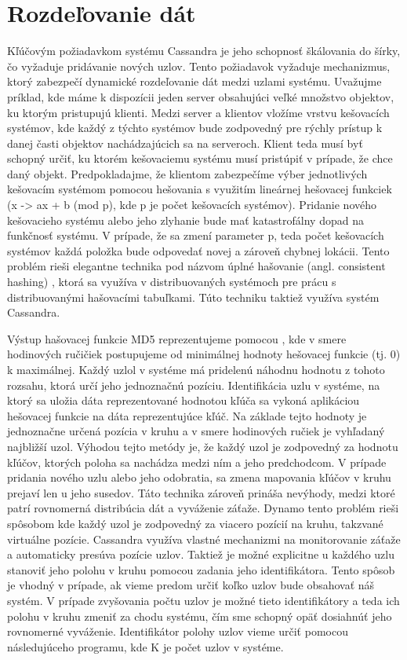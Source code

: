 \documentclass[11pt,twoside,a4paper]{book}
\begin{document}
\section{Rozdeľovanie dát}
Kľúčovým požiadavkom systému Cassandra je jeho schopnosť škálovania do šírky, čo vyžaduje pridávanie nových uzlov. Tento požiadavok vyžaduje mechanizmus, ktorý zabezpečí dynamické rozdeľovanie dát medzi uzlami systému. Uvažujme príklad, kde máme k dispozícii jeden server obsahujúci veľké množstvo objektov, ku ktorým pristupujú klienti. Medzi server a klientov vložíme vrstvu kešovacích systémov, kde každý z týchto systémov bude zodpovedný pre rýchly prístup k danej časti objektov nachádzajúcich sa na serveroch. Klient teda musí byť schopný určiť, ku ktorém kešovaciemu systému musí pristúpiť v prípade, že chce daný objekt. Predpokladajme, že klientom zabezpečíme výber jednotlivých kešovacím systémom pomocou hešovania s využitím lineárnej hešovacej funkciek (x -> ax + b (mod p), kde p je počet kešovacích systémov). Pridanie nového kešovacieho systému alebo jeho zlyhanie bude mať katastrofálny dopad na funkčnosť systému. V prípade, že sa zmení parameter p, teda počet kešovacích systémov každá položka bude odpovedať novej a zároveň chybnej lokácii. Tento problém rieši elegantne technika pod názvom úplné hašovanie (angl. consistent hashing) \cite{Karger:1997:CHR:258533.258660}, ktorá sa využíva v distribuovaných systémoch pre prácu s distribuovanými hašovacími tabuľkami. Túto techniku taktiež využíva systém Cassandra.

Výstup hašovacej funkcie MD5 reprezentujeme pomocou , kde v smere hodinových ručičiek postupujeme od minimálnej hodnoty hešovacej funkcie (tj. 0) k maximálnej. Každý uzlol v systéme má pridelenú náhodnu hodnotu z tohoto rozsahu, ktorá určí jeho jednoznačnú pozíciu. Identifikácia uzlu v systéme, na ktorý sa uložia dáta reprezentované hodnotou kľúča sa vykoná aplikáciou hešovacej funkcie na dáta reprezentujúce kľúč. Na základe tejto hodnoty je jednoznačne určená pozícia v kruhu a v smere hodinových ručiek je vyhľadaný najbližší uzol. Výhodou tejto metódy je, že každý uzol je zodpovedný za hodnotu kľúčov, ktorých poloha sa nachádza medzi ním a jeho predchodcom. V prípade pridania nového uzlu alebo jeho odobratia, sa zmena mapovania kľúčov v kruhu prejaví len u jeho susedov. Táto technika zároveň prináša nevýhody, medzi ktoré patrí rovnomerná distribúcia dát a vyváženie záťaže. Dynamo tento problém rieši spôsobom kde každý uzol je zodpovedný za viacero pozícií na kruhu, takzvané virtuálne pozície. Cassandra využíva vlastné mechanizmi na monitorovanie záťaže a automaticky presúva pozície uzlov. Taktiež je možné explicitne u každého uzlu stanoviť jeho polohu v kruhu pomocou zadania jeho identifikátora. Tento spôsob je vhodný v prípade, ak vieme predom určiť koľko uzlov bude obsahovať náš systém. V prípade zvyšovania počtu uzlov je možné tieto identifikátory a teda ich polohu v kruhu zmeniť za chodu systému, čím sme schopný opäť dosiahnúť jeho rovnomerné vyváženie. Identifikátor polohy uzlov vieme určiť pomocou následujúceho programu, kde K je počet uzlov v systéme.
\end{document}
